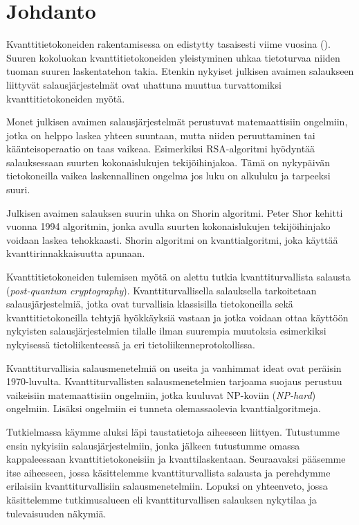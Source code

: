 \chapter{Johdanto\label{intro}}
Kvanttitietokoneiden rakentamisessa on edistytty tasaisesti viime vuosina (\cite{alagic2020status}). Suuren kokoluokan kvanttitietokoneiden yleistyminen uhkaa tietoturvaa niiden tuoman suuren laskentatehon takia. Etenkin nykyiset julkisen avaimen salaukseen liittyvät salausjärjestelmät ovat uhattuna muuttua turvattomiksi kvanttitietokoneiden myötä.

Monet julkisen avaimen salausjärjestelmät perustuvat matemaattisiin ongelmiin, jotka on helppo laskea yhteen suuntaan, mutta niiden peruuttaminen tai käänteisoperaatio on taas vaikeaa. Esimerkiksi RSA-algoritmi hyödyntää salauksessaan suurten kokonaislukujen tekijöihinjakoa. Tämä on nykypäivän tietokoneilla vaikea laskennallinen ongelma jos luku on alkuluku ja tarpeeksi suuri.

Julkisen avaimen salauksen suurin uhka on Shorin algoritmi. Peter Shor kehitti vuonna 1994 algoritmin, jonka avulla suurten kokonaislukujen tekijöihinjako voidaan laskea tehokkaasti. Shorin algoritmi on kvanttialgoritmi, joka käyttää kvanttirinnakkaisuutta apunaan.

Kvanttitietokoneiden tulemisen myötä on alettu tutkia kvanttiturvallista salausta (\emph{post-quantum cryptography}). Kvanttiturvallisella salauksella tarkoitetaan salausjärjestelmiä, jotka ovat turvallisia klassisilla tietokoneilla sekä kvanttitietokoneilla tehtyjä hyökkäyksiä vastaan ja jotka voidaan ottaa käyttöön nykyisten salausjärjestelmien tilalle ilman suurempia muutoksia esimerkiksi nykyisessä tietoliikenteessä ja eri tietoliikenneprotokollissa.

Kvanttiturvallisia salausmenetelmiä on useita ja vanhimmat ideat ovat peräisin 1970-luvulta. Kvanttiturvallisten salausmenetelmien tarjoama suojaus perustuu vaikeisiin matemaattisiin ongelmiin, jotka kuuluvat NP-koviin (\emph{NP-hard}) ongelmiin. Lisäksi ongelmiin ei tunneta olemassaolevia kvanttialgoritmeja.

Tutkielmassa käymme aluksi läpi taustatietoja aiheeseen liittyen. Tutustumme ensin nykyisiin salausjärjestelmiin, jonka jälkeen tutustumme omassa kappaleessaan kvanttitietokoneisiin ja kvanttilaskentaan. Seuraavaksi pääsemme itse aiheeseen, jossa käsittelemme kvanttiturvallista salausta ja perehdymme erilaisiin kvanttiturvallisiin salausmenetelmiin. Lopuksi on yhteenveto, jossa käsittelemme tutkimusalueen eli kvanttiturvallisen salauksen nykytilaa ja tulevaisuuden näkymiä.